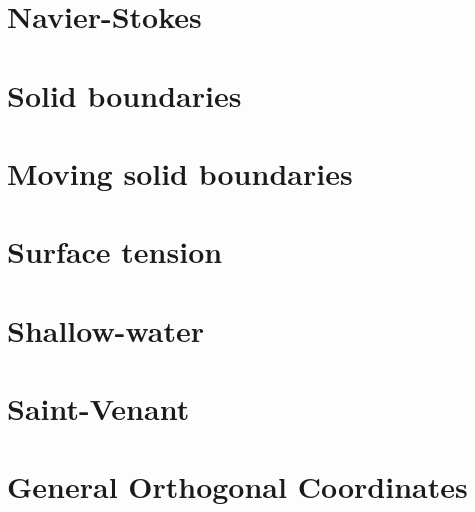 \documentclass[a4paper]{article}
\begin{document}
\section{Navier-Stokes}









\section{Solid boundaries}





\section{Moving solid boundaries}




\section{Surface tension}









\section{Shallow-water}







\section{Saint-Venant}



\section{General Orthogonal Coordinates}






\end{document}
